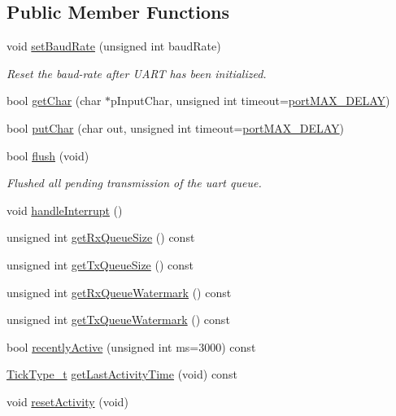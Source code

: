 \subsection*{Public Member Functions}
\begin{DoxyCompactItemize}
\item 
void \hyperlink{classUartDev_a478b22f1266a574c34baf660a5dc0f7f}{set\+Baud\+Rate} (unsigned int baud\+Rate)
\begin{DoxyCompactList}\small\item\em Reset the baud-\/rate after U\+A\+RT has been initialized. \end{DoxyCompactList}\item 
bool \hyperlink{classUartDev_a461bf31bdeb04e579dc1a9207ceb86e1}{get\+Char} (char $\ast$p\+Input\+Char, unsigned int timeout=\hyperlink{portmacro_8h_a72723ba1e4a85ca14f25c2b9e066613d}{port\+M\+A\+X\+\_\+\+D\+E\+L\+AY})
\item 
bool \hyperlink{classUartDev_a5540a663667da93bc166f81d4f72cd2c}{put\+Char} (char out, unsigned int timeout=\hyperlink{portmacro_8h_a72723ba1e4a85ca14f25c2b9e066613d}{port\+M\+A\+X\+\_\+\+D\+E\+L\+AY})
\item 
bool \hyperlink{classUartDev_ac50cca0665fac431db99ecdb242c6ee7}{flush} (void)
\begin{DoxyCompactList}\small\item\em Flushed all pending transmission of the uart queue. \end{DoxyCompactList}\item 
void \hyperlink{classUartDev_a88db44755fb545c2553cabf95a338db4}{handle\+Interrupt} ()
\end{DoxyCompactItemize}
{\bf }\par
\begin{DoxyCompactItemize}
\item 
unsigned int \hyperlink{classUartDev_a1ea0679fef2e1a42cb952271b423ee99}{get\+Rx\+Queue\+Size} () const 
\item 
unsigned int \hyperlink{classUartDev_a4b834fc64a81218d92aa5b20adfcd05d}{get\+Tx\+Queue\+Size} () const 
\item 
unsigned int \hyperlink{classUartDev_ab3d5e233b3534367556526027652211d}{get\+Rx\+Queue\+Watermark} () const 
\item 
unsigned int \hyperlink{classUartDev_a98baa125ecc96697113d59c1a4234d5c}{get\+Tx\+Queue\+Watermark} () const 
\end{DoxyCompactItemize}

{\bf }\par
\begin{DoxyCompactItemize}
\item 
bool \hyperlink{classUartDev_a178c3f9749ca21fe43066e06f754f5d0}{recently\+Active} (unsigned int ms=3000) const 
\item 
\hyperlink{portmacro_8h_aa69c48c6e902ce54f70886e6573c92a9}{Tick\+Type\+\_\+t} \hyperlink{classUartDev_aaaf62e3bab33af57c484e6cf657bf54f}{get\+Last\+Activity\+Time} (void) const 
\item 
void \hyperlink{classUartDev_a2a6fbc4ab47d0f0bd16b287828b75f3a}{reset\+Activity} (void)
\end{DoxyCompactItemize}

